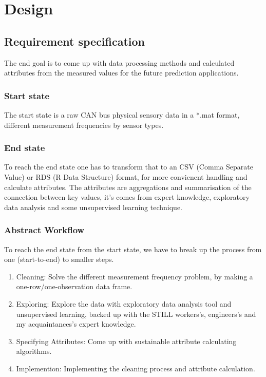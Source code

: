 \chapter{Design}
\section{Requirement specification}
	\noindent
The end goal is to come up with data processing methods and calculated attributes from the measured values for the future prediction applications.
	\subsection{Start state}
The start state is a raw CAN bus physical sensory data in a *.mat format, different measurement frequencies by sensor types.

	\subsection{End state}
		\noindent
To reach the end state one has to transform that to an CSV (Comma Separate Value) or RDS (R Data Structure) format, for more convienent handling and calculate attributes.
		\noindent
The attributes are aggregations and summarisation of the connection between key values, it's comes from expert knowledge, exploratory data analysis and some unsupervised learning technique.	 \subsection{Abstract Workflow}
To reach the end state from the start state, we have to break up the process from one (start-to-end) to smaller steps.

\begin{enumerate}
	\item {Cleaning:} Solve the different measurement frequency problem, by making a one-row/one-observation data frame.
	\item {Exploring:} Explore the data with exploratory data analysis tool and unsupervised learning, backed up with the STILL workers's, engineers's and my acquaintances's expert knowledge.
 	\item {Specifying Attributes:} Come up with sustainable attribute calculating algorithms.
 	\item {Implemention:} Implementing the cleaning process and attribute calculation.
\end{enumerate}

